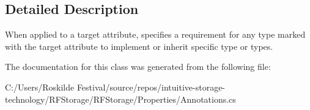 \subsection{Detailed Description}
When applied to a target attribute, specifies a requirement for any type marked with the target attribute to implement or inherit specific type or types. 


\begin{DoxyCode}{0}
\DoxyCodeLine{}
\DoxyCodeLine{[Component] \textcolor{comment}{// ComponentAttribute requires implementing IComponent interface}}
\end{DoxyCode}


The documentation for this class was generated from the following file\+:\begin{DoxyCompactItemize}
\item 
C\+:/\+Users/\+Roskilde Festival/source/repos/intuitive-\/storage-\/technology/\+R\+F\+Storage/\+R\+F\+Storage/\+Properties/Annotations.\+cs\end{DoxyCompactItemize}
